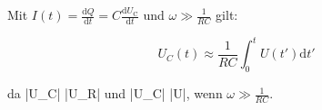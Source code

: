 Mit $I(t) = \frac{\mathrm{d}Q}{\mathrm{d}t} = C \frac{\mathrm{d}U_\mathrm{C}}{\mathrm{d}t}$ und $\omega \gg \frac{1}{RC}$ gilt:

\begin{equation}
  U_C(t) \approx \frac{1}{RC} \int_0^t U(t') \mathrm{d}t'
\end{equation}

da \left|U_{\mathrm C}\right| \ll \left|U_{\mathrm R}\right| und \left|U_{\mathrm C}\right| \ll \left|U\right|, wenn $\omega \gg \frac{1}{RC}$.
